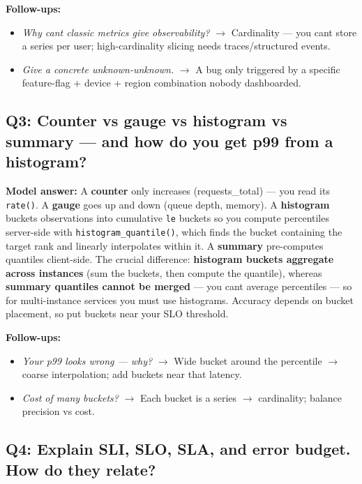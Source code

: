 \documentclass[11pt]{article}
\providecommand{\tightlist}{\setlength{\itemsep}{1pt}\setlength{\parskip}{0pt}}
\begin{document}
\textbf{Follow-ups:}

\begin{itemize}
\tightlist
\item
  \emph{Why can\textquotesingle t classic metrics give observability?} \(\rightarrow\) Cardinality --- you can\textquotesingle t store a series per user; high-cardinality slicing needs traces/structured events.
\item
  \emph{Give a concrete unknown-unknown.} \(\rightarrow\) A bug only triggered by a specific feature-flag + device + region combination nobody dashboarded.
\end{itemize}

\subsection{Q3: Counter vs gauge vs histogram vs summary --- and how do you get p99 from a histogram?}\label{q3-counter-vs-gauge-vs-histogram-vs-summary--and-how-do-you-get-p99-from-a-histogram}

\textbf{Model answer:} A \textbf{counter} only increases (requests\_total) --- you read its \texttt{rate()}. A \textbf{gauge} goes up and down (queue depth, memory). A \textbf{histogram} buckets observations into cumulative \texttt{le} buckets so you compute percentiles server-side with \texttt{histogram\_quantile()}, which finds the bucket containing the target rank and linearly interpolates within it. A \textbf{summary} pre-computes quantiles client-side. The crucial difference: \textbf{histogram buckets aggregate across instances} (sum the buckets, then compute the quantile), whereas \textbf{summary quantiles cannot be merged} --- you can\textquotesingle t average percentiles --- so for multi-instance services you must use histograms. Accuracy depends on bucket placement, so put buckets near your SLO threshold.

\textbf{Follow-ups:}

\begin{itemize}
\tightlist
\item
  \emph{Your p99 looks wrong --- why?} \(\rightarrow\) Wide bucket around the percentile \(\rightarrow\) coarse interpolation; add buckets near that latency.
\item
  \emph{Cost of many buckets?} \(\rightarrow\) Each bucket is a series \(\rightarrow\) cardinality; balance precision vs cost.
\end{itemize}

\subsection{Q4: Explain SLI, SLO, SLA, and error budget. How do they relate?}\label{q4-explain-sli-slo-sla-and-error-budget-how-do-they-relate}
\end{document}
